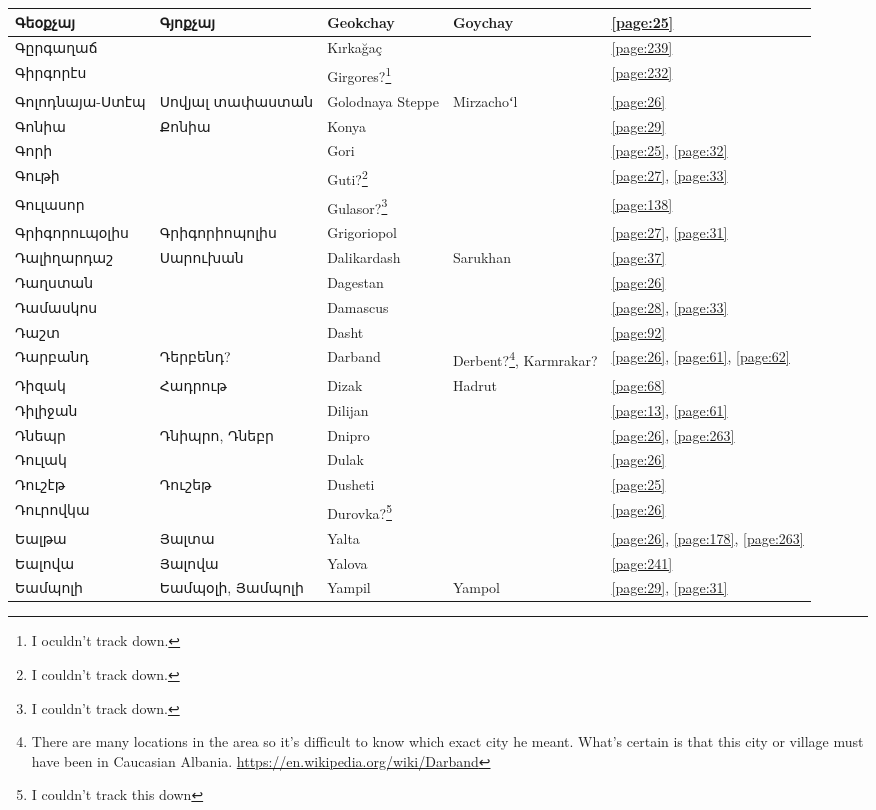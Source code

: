 \begin{center}
\begin{longtable}{|p{}|p{3cm}|p{3cm}|p{2cm}|p{3cm}|}
Գեօքչայ&Գյոքչայ
&{Geokchay} &Goychay &\ref{page:25}\\ \hline
Գըրգաղաճ& 
&Kırkağaç & &\ref{page:239}\\ \hline
Գիրգորէս&  
&{Girgores}?\footnote{I oculdn't track down.} & &\ref{page:232}\\ \hline
Գոլոդնայա-Ստէպ& Սովյալ տափաստան& 
Golodnaya Steppe& Mirzachoʻl&\ref{page:26}\\ \hline
Գոնիա& Քոնիա& 
{Konya}& &\ref{page:29}\\ \hline
Գորի& & 
{Gori}& &\ref{page:25}, \ref{page:32}\\ \hline
Գութի& &
{Guti?}\footnote{I couldn't track down.}&  &\ref{page:27}, \ref{page:33}\\ \hline
Գուլասոր& &
 Gulasor?\footnote{I couldn't track down.}& &\ref{page:138}\\ \hline
Գրիգորուպօլիս&Գրիգորիոպոլիս
& {Grigoriopol}& &\ref{page:27}, \ref{page:31}\\ \hline
Դալիղարդաշ&Սարուխան
& {Dalikardash}& Sarukhan&\ref{page:37}\\ \hline
Դաղստան& & 
{Dagestan}& &\ref{page:26}\\ \hline
Դամասկոս& &
Damascus& &\ref{page:28}, \ref{page:33}\\ \hline
Դաշտ& & 
{Dasht}& &\ref{page:92}\\ \hline
Դարբանդ& Դերբենդ?&
{Darband}&Derbent?\footnote{There are many locations in the area so it's difficult to know which exact city he meant. What's certain is that this city or village must have been in Caucasian Albania. \url{https://en.wikipedia.org/wiki/Darband}}, Karmrakar? &\ref{page:26}, \ref{page:61}, \ref{page:62}\\ \hline
Դիզակ& Հադրութ& 
Dizak &Hadrut &\ref{page:68}\\ \hline
Դիլիջան& &
Dilijan& &\ref{page:13}, \ref{page:61}\\ \hline
Դնեպր&Դնիպրո, Դնեբր & 
{Dnipro}& &\ref{page:26}, \ref{page:263}\\ \hline
Դուլակ& &
{Dulak}& &\ref{page:26}\\ \hline
Դուշէթ& Դուշեթ
&{Dusheti} & &\ref{page:25}\\ \hline
Դուրովկա& 
&{Durovka?}\footnote{I couldn't track this down} & &\ref{page:26}\\ \hline
Եալթա& Յալտա&{Yalta} 
& &\ref{page:26}, \ref{page:178}, \ref{page:263}\\ \hline
Եալովա& Յալովա
&{Yalova} & &\ref{page:241}\\ \hline
Եամպոլի& Եամպօլի, Յամպոլի&
{Yampil}&Yampol &\ref{page:29}, \ref{page:31}\\ \hline

\end{longtable}
\end{center}
